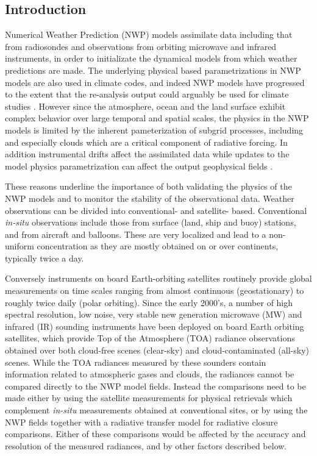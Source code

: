 \documentclass[agupp]{aguplus}              %
\begin{document}
\begin{article}

\section{Introduction}

Numerical Weather Prediction (NWP) models assimilate data including that 
from radiosondes  and observations from orbiting microwave
and infrared instruments, in order to initializate the dynamical
models from which weather predictions are made. The underlying
physical based parametrizations in NWP models are also used in climate
codes, and indeed NWP models have progressed to the extent that the
re-analysis output could arguably be used for climate studies
\citep{dee:11*1}. However since the atmosphere, ocean and the land
surface exhibit complex behavior over large temporal and spatial
scales, the physics in the NWP models is limited by the inherent
pameterization of subgrid processes, including and especially clouds
which are a critical component of radiative forcing. In addition
instrumental drifts affect the assimilated data while updates to
the model physics parametrization can affect the output geophysical
fields \cite{mor:91, sau:13}.

These reasons underline the importance of both validating the physics
of the NWP models and to monitor the stability of the observational
data. Weather observations can be divided into conventional- and
satellite- based. Conventional \emph{in-situ} observations include
those from surface (land, ship and buoy) stations, and from aircraft
and balloons. These are very localized and lead to a non-uniform
concentration as they are mostly obtained on or over continents,
typically twice a day.

Conversely instruments on board Earth-orbiting satellites routinely
provide global measurements on time scales ranging from almost
continuous (geostationary) to roughly twice daily (polar
orbiting). Since the early 2000's, a number of high spectral
resolution, low noise, very stable new generation microwave (MW) and
infrared (IR) sounding instruments have been deployed on board Earth
orbiting satellites, which provide Top of the Atmosphere (TOA)
radiance observations obtained over both cloud-free scenes (clear-sky)
and cloud-contaminated (all-sky) scenes. While the TOA radiances
measured by these sounders contain information related to atmospheric
gases and clouds, the radiances cannot be compared directly to the NWP
model fields. Instead the comparisons need to be made either by using
the satellite measurements for physical retrievals which complement
\emph{in-situ} measurements obtained at conventional sites, or by
using the NWP fields together with a radiative transfer model for
radiative closure comparisons. Either of these comparisons would be
affected by the accuracy and resolution of the measured radiances, and
by other factors described below.


\end{article}
\end{document}

